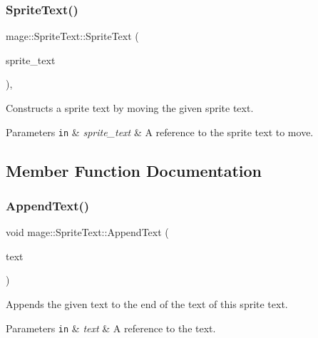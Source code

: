 \subsubsection{\texorpdfstring{Sprite\+Text()}{SpriteText()}\hspace{0.1cm}{\footnotesize\ttfamily [3/3]}}
{\footnotesize\ttfamily mage\+::\+Sprite\+Text\+::\+Sprite\+Text (\begin{DoxyParamCaption}\item[{\hyperlink{classmage_1_1_sprite_text}{Sprite\+Text} \&\&}]{sprite\+\_\+text }\end{DoxyParamCaption})\hspace{0.3cm}{\ttfamily [protected]}, {\ttfamily [default]}}

Constructs a sprite text by moving the given sprite text.


\begin{DoxyParams}[1]{Parameters}
\mbox{\tt in}  & {\em sprite\+\_\+text} & A reference to the sprite text to move. \\
\hline
\end{DoxyParams}


\subsection{Member Function Documentation}
\hypertarget{classmage_1_1_sprite_text_acf993532a7b2e6ebb761b9b47cbdba98}{}\label{classmage_1_1_sprite_text_acf993532a7b2e6ebb761b9b47cbdba98} 
\subsubsection{\texorpdfstring{Append\+Text()}{AppendText()}\hspace{0.1cm}{\footnotesize\ttfamily [1/3]}}
{\footnotesize\ttfamily void mage\+::\+Sprite\+Text\+::\+Append\+Text (\begin{DoxyParamCaption}\item[{const wstring \&}]{text }\end{DoxyParamCaption})}

Appends the given text to the end of the text of this sprite text.


\begin{DoxyParams}[1]{Parameters}
\mbox{\tt in}  & {\em text} & A reference to the text. \\
\hline
\end{DoxyParams}
\hypertarget{classmage_1_1_sprite_text_a462809b9138f94720f972505a4f74d81}{}\label{classmage_1_1_sprite_text_a462809b9138f94720f972505a4f74d81} 
